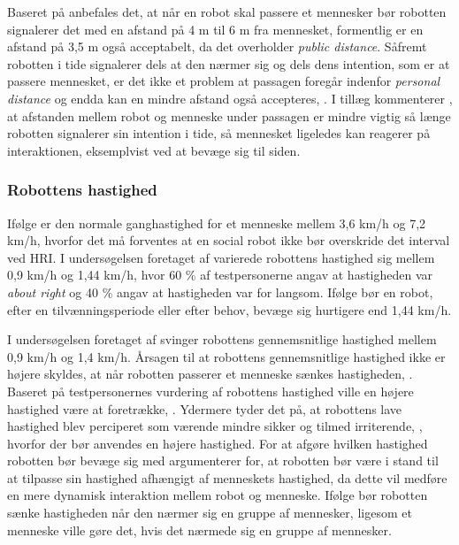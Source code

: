 Baseret på \textcite[ss. 169-170]{PDF:HumanRobotEmodiedInteraction} anbefales det, at når en robot skal passere et mennesker bør robotten signalerer det med en afstand på 4 m til 6 m fra mennesket, formentlig er en afstand på 3,5 m også acceptabelt, da det overholder \textit{public distance}. Såfremt robotten i tide signalerer dels at den nærmer sig og dels dens intention, som er at passere mennesket, er det ikke et problem at passagen foregår indenfor \textit{personal distance} og endda kan en mindre afstand også accepteres, \parencite[s. 170]{PDF:HumanRobotEmodiedInteraction}. I tillæg kommenterer \textcite[s. 170]{PDF:HumanRobotEmodiedInteraction}, at afstanden mellem robot og menneske under passagen er mindre vigtig så længe robotten signalerer sin intention i tide, så mennesket ligeledes kan reagerer på interaktionen, eksemplvist ved at bevæge sig til siden.    

\subsubsection*{Robottens hastighed}
\label{InteraktionSocialeRobotterParametreBevaegelsesmoenstreHastighed}
%
Ifølge \textcite[s. 165]{PDF:HumanRobotEmodiedInteraction} er den normale ganghastighed for et menneske mellem 3,6 km/h og 7,2 km/h, hvorfor det må forventes at en social robot ikke bør overskride det interval ved HRI. I undersøgelsen foretaget af \textcite[s. 175]{PDF:HowMayIServeYou} varierede robottens hastighed sig mellem 0,9 km/h og 1,44 km/h, hvor 60 \% af testpersonerne angav at hastigheden var \textit{about right} og 40 \% angav at hastigheden var for langsom. Ifølge \textcite[s. 178]{PDF:HowMayIServeYou} bør en robot, efter en tilvænningsperiode eller efter behov, bevæge sig hurtigere end 1,44 km/h. 

I undersøgelsen foretaget af \textcite[s. 169]{PDF:HumanRobotEmodiedInteraction} svinger robottens gennemsnitlige hastighed mellem 0,9 km/h og 1,4 km/h. Årsagen til at robottens gennemsnitlige hastighed ikke er højere skyldes, at når robotten passerer et menneske sænkes hastigheden, \parencite[s. 169]{PDF:HumanRobotEmodiedInteraction}. Baseret på testpersonernes vurdering af robottens hastighed ville en højere hastighed være at foretrække, \parencite[s. 169]{PDF:HumanRobotEmodiedInteraction}. Ydermere tyder det på, at robottens lave hastighed blev perciperet som værende mindre sikker og tilmed irriterende, \parencite[s. 169]{PDF:HumanRobotEmodiedInteraction}, hvorfor der bør anvendes en højere hastighed. For at afgøre hvilken hastighed robotten bør bevæge sig med argumenterer \textcite[s. 167]{PDF:HumanRobotEmodiedInteraction} for, at robotten bør være i stand til at tilpasse sin hastighed afhængigt af menneskets hastighed, da dette vil medføre en mere dynamisk interaktion mellem robot og menneske. Ifølge \textcite[s. 1897]{PDF:NavigationForHRITasks} bør robotten sænke hastigheden når den nærmer sig en gruppe af mennesker, ligesom et menneske ville gøre det, hvis det nærmede sig en gruppe af mennesker.

